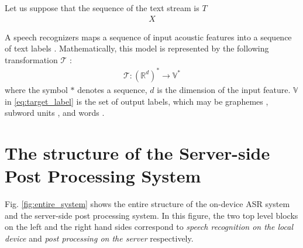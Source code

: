 \documentclass{article}
\begin{document}
Let us suppose that the sequence of the text stream is $T$  
\begin{align}
  X
\end{align}

A speech recognizers maps a sequence of input acoustic features into a sequence 
of text labels  \cite{r_prabhavalkar_interspeech_2017_00}. 
Mathematically, this model is 
represented by the following transformation $\mathcal{T}$ 
\cite{a_graves_icml_2006_00}:
\begin{align}
  \mathcal{T} : \left(\mathbb{R}^d\right)^{*} \rightarrow \mathbb{V}^{*}
	\label{eq:transformation}
\end{align}
where the symbol ${*}$ denotes a sequence, $d$ is the dimension of the input 
feature. $\mathbb{V}$ in \eqref{eq:target_label} is the set of output
labels, which may be graphemes 
\cite{j_chorowski_nips_2015_00,
w_chan_icassp_2016_00},
subword units \cite{
a_zeyer_interspeech_2018_00,
c_chiu_icassp_2018_00},
 and words \cite{h_soltau_interspeech_2017_00}.

 

\section{The structure of the Server-side Post Processing System}
\label{sec:server_side_post_processing}

Fig. \ref{fig:entire_system} shows the entire structure of the on-device ASR
system and the server-side post processing system. In this figure,  
the two top level blocks on the left and the right hand sides correspond
to {\it speech recognition on the local device} and 
{\it post processing on the server} respectively.  
\end{document}
